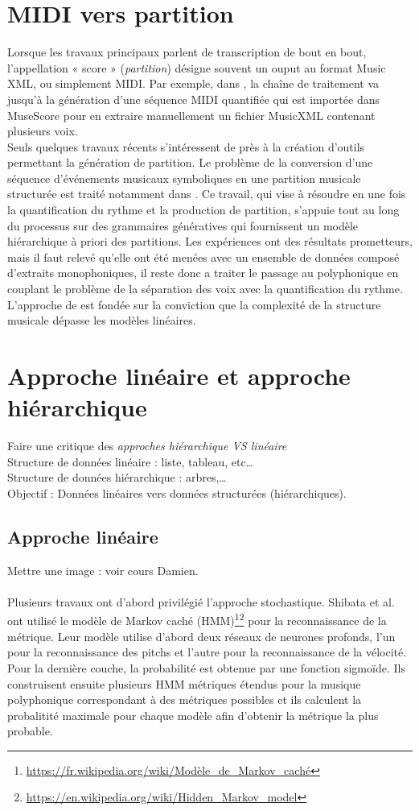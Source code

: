 \section{MIDI vers partition}
Lorsque les travaux principaux parlent de transcription de bout en bout, l’appellation « score » (\textit{partition}) désigne souvent un ouput au format Music XML, ou simplement MIDI. Par exemple, dans \cite{SHIBATA2021262}, la chaîne de traitement va jusqu’à la génération d’une séquence MIDI quantifiée qui est importée dans MuseScore pour en extraire manuellement un fichier MusicXML contenant plusieurs voix.\\
Seuls quelques travaux récents s’intéressent de près à la création d’outils permettant la génération de partition. Le problème de la conversion d'une séquence d'événements musicaux symboliques en une partition musicale structurée est traité notamment dans \cite{foscarin:hal-01988990}. Ce travail, qui vise à résoudre en une fois la quantification du rythme et la production de partition, s’appuie tout au long du processus sur  des grammaires génératives qui fournissent un modèle hiérarchique à priori des partitions. Les expériences ont des résultats prometteurs, mais il faut relevé qu’elle ont été menées avec un ensemble de données composé d'extraits monophoniques, il reste donc a traiter le passage au polyphonique en couplant le problème de la séparation des voix avec la quantification du rythme.\\
L'approche de \cite{foscarin:hal-01988990} est fondée sur la conviction que la complexité de la structure musicale dépasse les modèles linéaires.
\section{Approche linéaire et approche hiérarchique}
Faire une critique des \textit{approches hiérarchique VS linéaire}\\
Structure de données linéaire : liste, tableau, etc…\\
Structure de données hiérarchique : arbres,…\\
Objectif : Données linéaires vers données structurées (hiérarchiques).
\subsection*{Approche linéaire}
Mettre une image : voir cours Damien.\\\\
Plusieurs travaux ont d’abord privilégié l’approche stochastique. Shibata et al.\cite{SHIBATA2021262} ont utilisé le modèle de Markov caché (HMM)\footnote{\url{https://fr.wikipedia.org/wiki/Modèle_de_Markov_caché}}\footnote{\url{https://en.wikipedia.org/wiki/Hidden_Markov_model}} pour la reconnaissance de la métrique. Leur modèle utilise d’abord deux réseaux de neurones profonds, l’un pour la reconnaissance des pitchs et l’autre pour la reconnaissance de la vélocité. Pour la dernière couche, la probabilité est obtenue par une fonction sigmoïde. Ils construisent ensuite plusieurs HMM métriques étendus pour la musique polyphonique correspondant à des métriques possibles et ils calculent la probalitité maximale pour chaque modèle afin d’obtenir la métrique la plus probable.\\
